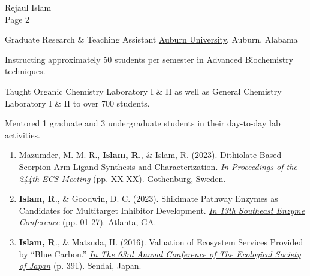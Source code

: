 \documentclass[10pt]{article}
\begin{document}
\begin{multicols}{2}
    \raggedright
    \normalsize{Rejaul Islam}\\[1ex]
    \columnbreak
    \raggedleft Page 2\\
\end{multicols}
\spacedhrule{-1.0ex}{-0.5ex}

\headedsectionthree
{Graduate Research \& Teaching Assistant}{}
{\href{https://www.auburn.edu/}{Auburn University,} {Auburn, Alabama}}
{\vspace{-2.4ex}
    \begin{circlist}
        \item Instructing approximately 50 students per semester in Advanced Biochemistry techniques. 
        \item Taught Organic Chemistry Laboratory I \& II as well as General Chemistry Laboratory I \& II to over 700 students.
        \item Mentored 1 graduate and 3 undergraduate students in their day-to-day lab activities.
    \end{circlist}
}

\spacedhrule{0.8ex}{0.0ex}

\begin{enumerate}
    \item Mazumder, M. M. R., \textbf{Islam, R}., \& Islam, R. (2023). Dithiolate-Based Scorpion Arm Ligand Synthesis and Characterization. \href{https://ecs.confex.com/ecs/244/meetingapp.cgi/Paper/181554}{\textit{In Proceedings of the 244th ECS Meeting}} (pp. XX-XX). Gothenburg, Sweden.
    \item \textbf{Islam, R}., \& Goodwin, D. C. (2023). Shikimate Pathway Enzymes as Candidates for Multitarget Inhibitor Development. \href{https://sec.gsu.edu/files/2023/04/13th-SEC-Program-Booklet-Final.pdf}{\textit{In 13th Southeast Enzyme Conference}} (pp. 01-27). Atlanta, GA.
    \item \textbf{Islam, R}., \& Matsuda, H. (2016). Valuation of Ecosystem Services Provided by “Blue Carbon.” \href{https://www.esj.ne.jp/meeting/abst/63/P2-391.html}{\textit{In The 63rd Annual Conference of The Ecological Society of Japan}}  (p. 391). Sendai, Japan.
\end{enumerate}
\end{document}
